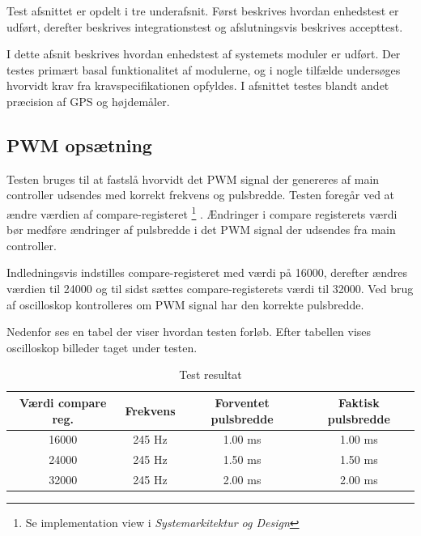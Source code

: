 
Test afsnittet er opdelt i tre underafsnit. 
Først beskrives hvordan enhedstest er udført, derefter beskrives integrationstest og afslutningsvis beskrives accepttest. 



I dette afsnit beskrives hvordan enhedstest af systemets moduler er udført. Der testes primært basal funktionalitet af modulerne, og i nogle tilfælde undersøges hvorvidt krav fra kravspecifikationen opfyldes. I afsnittet testes blandt andet præcision af GPS og højdemåler.


\subsection{PWM opsætning}

Testen bruges til at fastslå hvorvidt det PWM signal der genereres af main controller udsendes med korrekt frekvens og pulsbredde. Testen foregår ved at ændre værdien af compare-registeret \footnote{Se implementation view i \textit{Systemarkitektur og Design}} . Ændringer i compare registerets værdi bør medføre ændringer af pulsbredde i det PWM signal der udsendes fra main controller. 

Indledningsvis indstilles compare-registeret med værdi på 16000, derefter ændres værdien til 24000 og til sidst sættes compare-registerets værdi til 32000. Ved brug af oscilloskop kontrolleres om PWM signal har den korrekte pulsbredde. 

Nedenfor ses en tabel der viser hvordan testen forløb. Efter tabellen vises oscilloskop billeder taget under testen. 

\vspace{0.50cm}

\begin{table}[H]
	\centering
		\begin{tabular}{|c|c|c|c|}
			\hline
			Værdi compare reg. & Frekvens & Forventet pulsbredde & Faktisk pulsbredde \\ \hline
			16000 & 245 Hz & 1.00 ms & 1.00 ms \\ \hline			
			24000 & 245 Hz & 1.50 ms & 1.50 ms \\ \hline
			32000 & 245 Hz & 2.00 ms & 2.00 ms \\ \hline
		\end{tabular}
	\caption{Test resultat}
\end{table}

\vspace{0.50cm}

